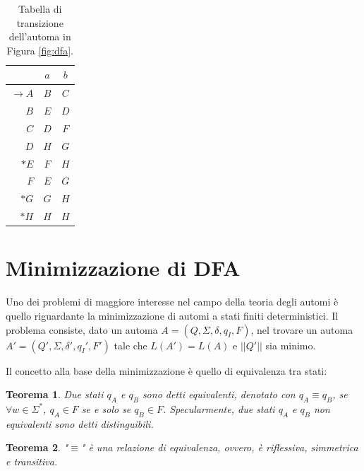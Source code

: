 \documentclass[a4paper,12pt]{report}
\newtheorem{theorem}{Teorema}[chapter]
\begin{document}
\begin{table}[!htb]
  \centering
  \begin{tabular}{r|c|c}
    \toprule
                      & $a$ & $b$ \\
    \midrule
    $\rightarrow A$   & $B$ & $C$ \\
    $B$               & $E$ & $D$ \\
    $C$               & $D$ & $F$ \\
    $D$               & $H$ & $G$ \\
    $*E$              & $F$ & $H$ \\
    $F$               & $E$ & $G$ \\
    $*G$              & $G$ & $H$ \\
    $*H$              & $H$ & $H$ \\
    \bottomrule
  \end{tabular}
  \caption{\label{tab:transitions}Tabella di transizione dell'automa in Figura \ref{fig:dfa}.}
\end{table}

\section{Minimizzazione di DFA}

Uno dei problemi di maggiore interesse nel campo della teoria degli automi è quello riguardante la minimizzazione di 
automi a stati finiti deterministici. Il problema consiste, dato un automa $A = (Q, \Sigma, \delta, q_I, F)$,
nel trovare un automa $A' = (Q', \Sigma, \delta', q_I', F')$ tale che $L(A') = L(A)$ e $||Q'||$ sia minimo.

Il concetto alla base della minimizzazione è quello di equivalenza tra stati:

\begin{theorem}
  \label{th:eq-states}
  Due stati $q_A$ e $q_B$ sono detti equivalenti, denotato con $q_A \equiv q_B$, 
  se $\forall w \in \Sigma^*$, $q_A \in F$ se e solo se $q_B \in F$.
  Specularmente, due stati $q_A$ e $q_B$ non equivalenti sono detti distinguibili.
\end{theorem}

\begin{theorem}
  \label{th:eq-rel-states}
  "$\equiv$" è una relazione di equivalenza, ovvero, è riflessiva, simmetrica e transitiva.
\end{theorem}
\end{document}
